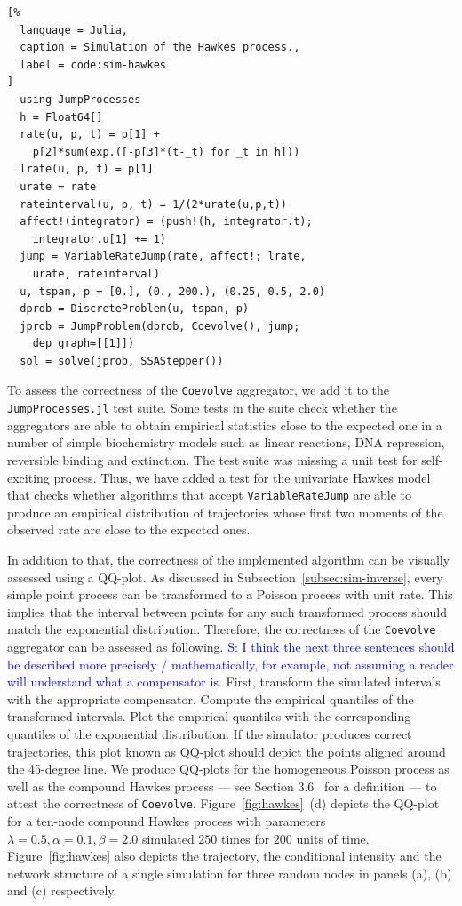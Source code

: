 \documentclass{juliacon}
\newcommand{\comment}[1]{\textcolor{blue}{#1}}
\begin{document}
\begin{lstlisting}[%
  language = Julia,
  caption = Simulation of the Hawkes process.,
  label = code:sim-hawkes
]
  using JumpProcesses
  h = Float64[]
  rate(u, p, t) = p[1] +
    p[2]*sum(exp.([-p[3]*(t-_t) for _t in h]))
  lrate(u, p, t) = p[1]
  urate = rate
  rateinterval(u, p, t) = 1/(2*urate(u,p,t))
  affect!(integrator) = (push!(h, integrator.t);
    integrator.u[1] += 1)
  jump = VariableRateJump(rate, affect!; lrate,
    urate, rateinterval)
  u, tspan, p = [0.], (0., 200.), (0.25, 0.5, 2.0)
  dprob = DiscreteProblem(u, tspan, p)
  jprob = JumpProblem(dprob, Coevolve(), jump;
    dep_graph=[[1]])
  sol = solve(jprob, SSAStepper())
\end{lstlisting}

To assess the correctness of the \texttt{Coevolve} aggregator, we add it to the \texttt{JumpProcesses.jl} test suite. Some tests in the suite check whether the aggregators are able to obtain empirical statistics close to the expected one in a number of simple biochemistry models such as linear reactions, DNA repression, reversible binding and extinction. The test suite was missing a unit test for self-exciting process. Thus, we have added a test for the univariate Hawkes model that checks whether algorithms that accept \texttt{VariableRateJump} are able to produce an empirical distribution of trajectories whose first two moments of the observed rate are close to the expected ones.

In addition to that, the correctness of the implemented algorithm can be visually assessed using a QQ-plot. As discussed in Subsection~\ref{subsec:sim-inverse}, every simple point process can be transformed to a Poisson process with unit rate. This implies that the interval between points for any such transformed process should match the exponential distribution. Therefore, the correctness of the \texttt{Coevolve} aggregator can be assessed as following. \comment{S: I think the next three sentences should be described more precisely / mathematically, for example, not assuming a reader will understand what a compensator is.} First, transform the simulated intervals with the appropriate compensator. Compute the empirical quantiles of the transformed intervals. Plot the empirical quantiles with the corresponding quantiles of the exponential distribution. If the simulator produces correct trajectories, this plot known as QQ-plot should depict the points aligned around the 45-degree line. We produce QQ-plots for the homogeneous Poisson process as well as the compound Hawkes process --- see Section 3.6~\cite{laub2021} for a definition --- to attest the correctness of \texttt{Coevolve}. Figure~\ref{fig:hawkes}~(d) depicts the QQ-plot for a ten-node compound Hawkes process with parameters \( \lambda = 0.5 , \alpha = 0.1 , \beta = 2.0 \) simulated \( 250 \) times for \( 200 \) units of time. Figure~\ref{fig:hawkes} also depicts the trajectory, the conditional intensity and the network structure of a single simulation for three random nodes in panels (a), (b) and (c) respectively.
\end{document}
